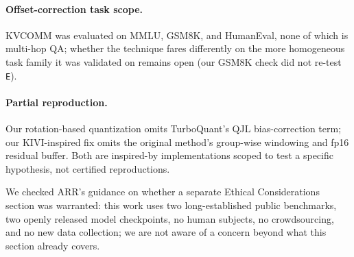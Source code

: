 \documentclass[11pt]{article}
\begin{document}
\paragraph{Offset-correction task scope.} KVCOMM was evaluated on MMLU,
GSM8K, and HumanEval, none of which is multi-hop QA; whether the
technique fares differently on the more homogeneous task family it was
validated on remains open (our GSM8K check did not re-test \texttt{E}).

\paragraph{Partial reproduction.} Our rotation-based quantization omits
TurboQuant's QJL bias-correction term; our KIVI-inspired fix omits the
original method's group-wise windowing and fp16 residual buffer. Both
are inspired-by implementations scoped to test a specific hypothesis,
not certified reproductions.

We checked ARR's guidance on whether a separate Ethical Considerations
section was warranted: this work uses two long-established public
benchmarks, two openly released model checkpoints, no human subjects,
no crowdsourcing, and no new data collection; we are not aware of a
concern beyond what this section already covers.
\end{document}

